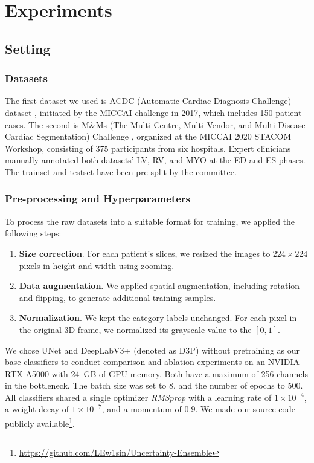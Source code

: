 \section{Experiments}
\subsection{Setting}
\subsubsection{Datasets}
The first dataset we used is ACDC (Automatic Cardiac Diagnosis Challenge) dataset \cite{bernard2018deep}, initiated by the MICCAI challenge in 2017, which includes 150 patient cases. The second is M\&Ms (The Multi-Centre, Multi-Vendor, and Multi-Disease Cardiac Segmentation) Challenge \cite{campello2021multi}, organized at the MICCAI 2020 STACOM Workshop, consisting of 375 participants from six hospitals. Expert clinicians manually annotated both datasets' LV, RV, and MYO at the ED and ES phases. The trainset and testset have been pre-split by the committee.

\subsubsection{Pre-processing and Hyperparameters}
To process the raw datasets into a suitable format for training, we applied the following steps:
\begin{enumerate}
    \item \textbf{Size correction}. For each patient's slices, we resized the images to \(224 \times 224\) pixels in height and width using zooming.
    \item \textbf{Data augmentation}. We applied spatial augmentation, including rotation and flipping, to generate additional training samples.
    \item \textbf{Normalization}. We kept the category labels unchanged. For each pixel in the original 3D frame, we normalized its grayscale value to the \([0, 1]\).
\end{enumerate}

We chose UNet and DeepLabV3+ (denoted as D3P) without pretraining as our base classifiers to conduct comparison and ablation experiments on an NVIDIA RTX A5000 with 24~GB of GPU memory. Both have a maximum of 256 channels in the bottleneck. The batch size was set to 8, and the number of epochs to 500. All classifiers shared a single optimizer \textit{RMSprop} with a learning rate of $1 \times 10^{-4}$, a weight decay of $1 \times 10^{-7}$, and a momentum of $0.9$. We made our source code publicly available\footnote{\url{https://github.com/LEw1sin/Uncertainty-Ensemble}}.

